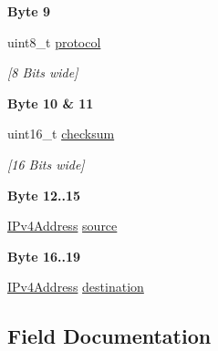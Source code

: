 \begin{Indent}\textbf{ Byte 9}\par
\begin{DoxyCompactItemize}
\item 
uint8\+\_\+t \mbox{\hyperlink{structipv4_header__t_ad124d3d2e02c729afa303c775295278e}{protocol}}
\begin{DoxyCompactList}\small\item\em \mbox{[}8 Bits wide\mbox{]} \end{DoxyCompactList}\end{DoxyCompactItemize}
\end{Indent}
\begin{Indent}\textbf{ Byte 10 \& 11}\par
\begin{DoxyCompactItemize}
\item 
uint16\+\_\+t \mbox{\hyperlink{structipv4_header__t_a6796c847bbd16253ce2538754c250bd6}{checksum}}
\begin{DoxyCompactList}\small\item\em \mbox{[}16 Bits wide\mbox{]} \end{DoxyCompactList}\end{DoxyCompactItemize}
\end{Indent}
\begin{Indent}\textbf{ Byte 12..15}\par
\begin{DoxyCompactItemize}
\item 
\mbox{\hyperlink{group__ipv4_gaea6452a06c6a1edb025bdd2a70fef14c}{I\+Pv4\+Address}} \mbox{\hyperlink{structipv4_header__t_ae5e26d61ffcb6e12414716869fc6e8e8}{source}}
\end{DoxyCompactItemize}
\end{Indent}
\begin{Indent}\textbf{ Byte 16..19}\par
\begin{DoxyCompactItemize}
\item 
\mbox{\hyperlink{group__ipv4_gaea6452a06c6a1edb025bdd2a70fef14c}{I\+Pv4\+Address}} \mbox{\hyperlink{structipv4_header__t_a3eb32496d9688dd666653f0093f99081}{destination}}
\end{DoxyCompactItemize}
\end{Indent}


\subsection{Field Documentation}
\mbox{\label{structipv4_header__t_a6796c847bbd16253ce2538754c250bd6}} 

